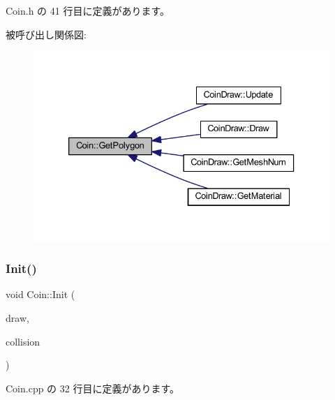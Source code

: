  Coin.\+h の 41 行目に定義があります。

被呼び出し関係図\+:\nopagebreak
\begin{figure}[H]
\begin{center}
\leavevmode
\includegraphics[width=333pt]{class_coin_af435ca01cc92d7214e7bc94ed486ab7b_icgraph}
\end{center}
\end{figure}
\mbox{\label{class_coin_aecb007762f15ecc91cd6a699e60c2e19}} 
\subsubsection{\texorpdfstring{Init()}{Init()}}
{\footnotesize\ttfamily void Coin\+::\+Init (\begin{DoxyParamCaption}\item[{\mbox{\hyperlink{class_draw_base}{Draw\+Base}} $\ast$}]{draw,  }\item[{\mbox{\hyperlink{class_collision_base}{Collision\+Base}} $\ast$}]{collision }\end{DoxyParamCaption})}



 Coin.\+cpp の 32 行目に定義があります。


